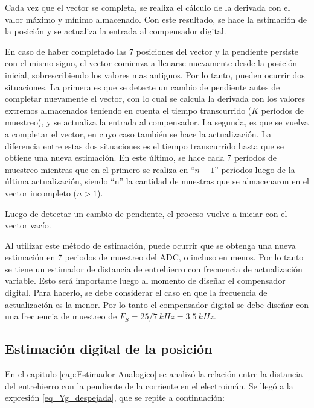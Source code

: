 Cada vez que el vector se completa, se realiza el cálculo de la derivada con el valor máximo y mínimo almacenado. Con este resultado, se hace la estimación de la posición y se actualiza la entrada al compensador digital.

En caso de haber completado las 7 posiciones del vector y la pendiente persiste con el mismo signo, el vector comienza a llenarse nuevamente desde la posición inicial, sobrescribiendo los valores mas antiguos. Por lo tanto, pueden ocurrir dos situaciones. La primera es que se detecte un cambio de pendiente antes de completar nuevamente el vector, con lo cual se calcula la derivada con los valores extremos almacenados teniendo en cuenta el tiempo transcurrido ($K$ períodos de muestreo), y se actualiza la entrada al compensador. La segunda, es que se vuelva a completar el vector, en cuyo caso también se hace la actualización. La diferencia entre estas dos situaciones es el tiempo transcurrido hasta que se obtiene una nueva estimación. En este último, se hace cada 7 períodos de muestreo mientras que en el primero se realiza en ``$n-1$'' períodos luego de la última actualización, siendo “n” la cantidad de muestras que se almacenaron en el vector incompleto ($n>1$).

Luego de detectar un cambio de pendiente, el
proceso vuelve a iniciar con el vector vacío.

Al utilizar este método de estimación, puede ocurrir que se obtenga una nueva estimación en 7 periodos de muestreo del ADC, o incluso en menos. Por lo tanto se tiene un estimador de distancia de entrehierro con frecuencia de actualización variable. Esto será importante luego al momento de diseñar el compensador digital. Para hacerlo, se debe considerar el caso en que la frecuencia de actualización es la menor. Por lo tanto el compensador digital se debe diseñar con una frecuencia de muestreo de $F_S=25/7 \:kHz = 3.5\:kHz$.



\subsection{Estimación digital de la posición}

En el capitulo \ref{cap:Estimador Analogico} se analizó la relación entre la distancia del entrehierro con la pendiente de la corriente en el electroimán. Se llegó a la expresión \ref{eq_Yg_despejada}, que se repite a continuación:

